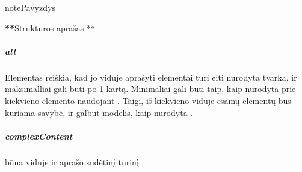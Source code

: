 \documentclass[letterpaper,10pt,lithuanian]{sphinxmanual}
\begin{document}
\begin{sphinxadmonition}{note}{Pavyzdys}
\begin{sphinxVerbatim}[commandchars=\\\{\}]


\end{sphinxVerbatim}

\sphinxAtStartPar
{\color{red}\bfseries{}**}Struktūros aprašas \sphinxhyphen{} **
\end{sphinxadmonition}


\subparagraph{all}
\label{\detokenize{schemos/xsd:all}}\label{\detokenize{schemos/xsd:xsd-all}}
\sphinxAtStartPar
Elementas  reiškia, kad jo viduje aprašyti elementai turi eiti nurodyta tvarka, ir maksimalliai
gali būti po 1 kartą. Minimaliai gali būti taip, kaip nurodyta prie kiekvieno elemento naudojant
{\hyperref[\detokenize{schemos/xsd:xsd-minoccurs}]{}}. Taigi, iš kiekvieno  viduje esamų elementų bus kuriama savybė,
ir galbūt modelis, kaip nurodyta {\hyperref[\detokenize{schemos/xsd:xsd-element}]{}}.


\subparagraph{complexContent}
\label{\detokenize{schemos/xsd:complexcontent}}\label{\detokenize{schemos/xsd:xsd-complex-content}}
\sphinxAtStartPar
{} būna {\hyperref[\detokenize{schemos/xsd:xsd-complextype}]{}} viduje ir aprašo sudėtinį turinį.
\end{document}
